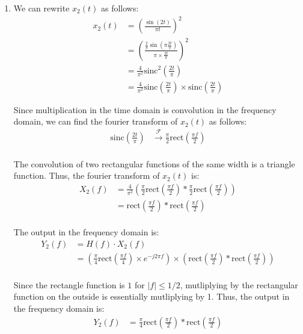 \documentclass{article}
\begin{document}
\begin{enumerate}[label=2.\arabic*]
    \item We can rewrite $x_2(t)$ as follows:   
    \begin{align*}
        x_2(t) &= \left(\frac{\sin(2t)}{\pi t}\right)^2 \\
        &= \left(\frac{\frac{2}{\pi} \sin\left(\pi \frac{2t}{\pi}\right)}{\pi \times \frac{2t}{\pi}}\right)^2 \\
        &= \frac{4}{\pi^2} \text{sinc}^2\left(\frac{2t}{\pi}\right) \\
        &= \frac{4}{\pi^2} \text{sinc}\left(\frac{2t}{\pi}\right) \times \text{sinc}\left(\frac{2t}{\pi}\right)
    \end{align*}

    Since multiplication in the time domain is convolution in the frequency domain, we can find the fourier transform of $x_2(t)$ as follows:
    \begin{align*}
        \text{sinc}\left(\frac{2t}{\pi}\right) &\xrightarrow{\mathcal{F}} \frac{\pi}{2}\text{rect}\left(\frac{\pi f}{2}\right) \\
    \end{align*}

    The convolution of two rectangular functions of the same width is a triangle function. Thus, the fourier transform of $x_2(t)$ is:
    \begin{align*}
        X_2(f) &= \frac{4}{\pi^2}\left(
            \frac{\pi}{2}\text{rect}\left(\frac{\pi f}{2}\right) \ast \frac{\pi}{2}\text{rect}\left(\frac{\pi f}{2}\right)
        \right) \\
        &= \text{rect}\left(\frac{\pi f}{2}\right) \ast \text{rect}\left(\frac{\pi f}{2}\right) \\
    \end{align*}

    The output in the frequency domain is:
    \begin{align*}
        Y_2(f) &= H(f) \cdot X_2(f) \\
        &= \left(\frac{\pi}{4} \text{rect}\left(\frac{\pi f}{4}\right) \times e^{-j2\pi f}\right) \times \left(\text{rect}\left(\frac{\pi f}{2}\right) \ast \text{rect}\left(\frac{\pi f}{2}\right)\right) \\
    \end{align*}

    Since the rectangle function is $1$ for $|f| \leq 1/2$, mutliplying by the rectangular function on the outside is essentially mutliplying by 1. Thus, the output in the frequency domain is:
    \begin{align*}
        Y_2(f) &=  \frac{\pi}{4}\text{rect}\left(\frac{\pi f}{2}\right) \ast \text{rect}\left(\frac{\pi f}{2}\right) \\
    \end{align*}


\end{enumerate}
\end{document}
